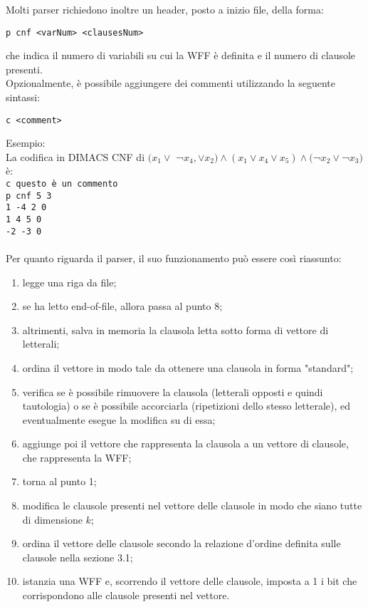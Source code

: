 Molti parser richiedono inoltre un header, posto a inizio file, della forma:
\begin{center}
    \verb|p cnf <varNum> <clausesNum>|
\end{center}
che indica il numero di variabili su cui la WFF è definita e il numero di clausole presenti.\\
Opzionalmente, è possibile aggiungere dei commenti utilizzando la seguente sintassi:
\begin{center}
    \verb|c <comment>|
\end{center}
Esempio:\\
La codifica in DIMACS CNF di $(x_1 \lor$ ¬$x_4, \lor x_2) \land (x_1 \lor x_4 \lor x_5) \land ($¬$x_2 \lor $¬$x_3)$ è:\\
\verb|c questo è un commento|\\
\verb|p cnf 5 3|\\
\verb|1 -4 2 0|\\
\verb|1 4 5 0|\\
\verb|-2 -3 0|\\
\\
Per quanto riguarda il parser, il suo funzionamento può essere così riassunto:
\begin{enumerate}
    \item legge una riga da file;
    \item se ha letto end-of-file, allora passa al punto 8;
    \item altrimenti, salva in memoria la clausola letta sotto forma di vettore di letterali;
    \item ordina il vettore in modo tale da ottenere una clausola in forma "standard";
    \item verifica se è possibile rimuovere la clausola (letterali opposti e quindi tautologia) o se è possibile accorciarla (ripetizioni dello stesso letterale), ed eventualmente esegue la modifica su di essa;
    \item aggiunge poi il vettore che rappresenta la clausola a un vettore di clausole, che rappresenta la WFF;
    \item torna al punto 1;
    \item modifica le clausole presenti nel vettore delle clausole in modo che siano tutte di dimensione $k$;
    \item ordina il vettore delle clausole secondo la relazione d'ordine definita sulle clausole nella sezione 3.1;
    \item istanzia una WFF e, scorrendo il vettore delle clausole, imposta a 1 i bit che corrispondono alle clausole presenti nel vettore.
\end{enumerate}